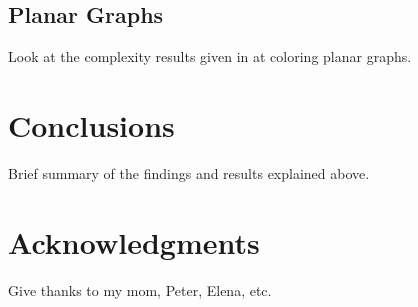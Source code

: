 \documentclass{sig-alternate}
\begin{document}
\subsection{Planar Graphs}
Look at the complexity results given in \cite{abel2017three} at coloring planar graphs.

\section{Conclusions}
Brief summary of the findings and results explained above.

\section{Acknowledgments}
Give thanks to my mom, Peter, Elena, etc.



\end{document}

